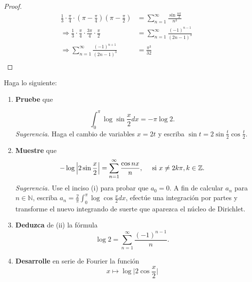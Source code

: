 \documentclass[12pt]{report}
\theoremstyle{largebreak}
\begin{document}
\begin{proof}
\begin{equation*}
            \begin{split}
                \frac{1}{3}\cdot\frac{\pi}{4}\cdot(\pi-\frac{\pi}{4})(\pi-\frac{\pi}{2})&=\sum_{ n=1}^{\infty}\frac{\sin\frac{n\pi}{2}}{n^3}\\
                \Rightarrow \frac{1}{3}\cdot\frac{\pi}{4}\cdot\frac{3\pi}{4}\cdot\frac{\pi}{2}&=\sum_{ n=1}^{\infty }\frac{(-1)^{ n-1}}{(2n-1)^3}\\
                \Rightarrow \sum_{ n=1}^{\infty }\frac{(-1)^{ n+1}}{(2n-1)^3}&=\frac{\pi^3}{32}\\
            \end{split}
        \end{equation*}
    \end{proof}

    \renewcommand{\theenumi}{\textbf{\roman{enumi}}}
    
    \begin{excer}
        Haga lo siguiente:
        \begin{enumerate}
            \item \textbf{Pruebe} que
            
            \begin{equation*}
                \int_0^\pi\log\sin\frac{x}{2}dx=-\pi\log2.
            \end{equation*}
            \textit{Sugerencia}. Haga el cambio de variables $x=2t$ y escriba $\sin t =2\sin\frac{t}{2}\cos\frac{t}{2}$.
            \item \textbf{Muestre} que
            \begin{equation*}
                -\log\Big|2\sin\frac{x}{2}\Big|=\sum_{ n=1}^\infty\frac{\cos nx}{n},\quad\textup{ si }x\neq 2k\pi,k\in\mathbb{Z}.
            \end{equation*}
            \textit{Sugerencia.} Use el inciso (i) para probar que $a_0=0$. A fin de calcular $a_n$ para $n\in\mathbb{N}$, escriba $a_n=\frac{2}{\pi}\int_0^\pi\log\cos\frac{x}{2}dx$, efectúe una integración por partes y transforme el nuevo integrando de suerte que aparezca el núcleo de Dirichlet.
            \item \textbf{Deduzca} de (ii) la fórmula
            \begin{equation*}
                \log2=\sum_{ n=1}^\infty\frac{(-1)^{ n-1}}{n}.
            \end{equation*}
            \item \textbf{Desarrolle} en serie de Fourier la función
            \begin{equation*}
                x\mapsto\log\Big|2\cos\frac{x}{2}\Big|
            \end{equation*}
        \end{enumerate}
    \end{excer}
\end{document}
